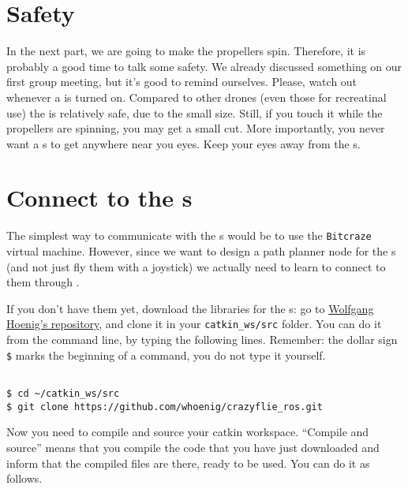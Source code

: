 \section*{Safety}

In the next part, we are going to make the propellers spin.
Therefore, it is probably a good time to talk some safety.
We already discussed something on our first group meeting, but it's good to remind ourselves.
Please, watch out whenever a \CF{} is turned on.
Compared to other drones (even those for recreatinal use) the \CF{} is relatively safe, due to the small size.
Still, if you touch it while the propellers are spinning, you may get a small cut.
More importantly, you never want a \CF{}s to get anywhere near you eyes.
Keep your eyes away from the \CF{}s.







\section*{Connect to the \CF{}s}

The simplest way to communicate with the \CF{}s would be to use the \texttt{Bitcraze} virtual machine.
However, since we want to design a path planner \ROS{} node for the \CF{}s (and not just fly them with a joystick) we actually need to learn to connect to them through \ROS{}.

If you don't have them yet, download the \ROS{} libraries for the \CF{}s:
go to \href{}{Wolfgang Hoenig's repository}, and clone it in your \verb|catkin_ws/src| folder.
You can do it from the command line, by typing the following lines.
Remember: the dollar sign \verb|$| marks the beginning of a command, you do not type it yourself.

\begin{Verbatim}[fontsize=\small]

$ cd ~/catkin_ws/src
$ git clone https://github.com/whoenig/crazyflie_ros.git

\end{Verbatim}

Now you need to compile and source your catkin workspace.
``Compile and source'' means that you compile the code that you have just downloaded and inform \ROS{} that the compiled files are there, ready to be used.
You can do it as follows.

